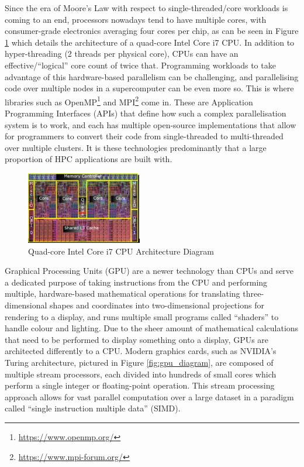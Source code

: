 \documentclass[conference]{IEEEtran}
\begin{document}
Since the era of Moore’s Law with respect to single-threaded/core workloads is coming to an end\cite{mooreslaw}, processors nowadays tend to have multiple cores, with consumer-grade electronics averaging four cores per chip, as can be seen in Figure \ref{fig:cpu_diagram} which details the architecture of a quad-core Intel Core i7 CPU. In addition to hyper-threading (2 threads per physical core), CPUs can have an effective/``logical” core count of twice that. Programming workloads to take advantage of this hardware-based parallelism can be challenging, and parallelising code over multiple nodes in a supercomputer can be even more so. This is where libraries such as OpenMP\footnote{\url{https://www.openmp.org/}} and MPI\footnote{\url{https://www.mpi-forum.org/}} come in. These are Application Programming Interfaces (APIs) that define how such a complex parallelisation system is to work, and each has multiple open-source implementations that allow for programmers to convert their code from single-threaded to multi-threaded over multiple clusters. It is these technologies predominantly that a large proportion of HPC applications are built with.

\begin{figure}
\centering
\includegraphics[width=0.45\textwidth]{cpu_diagram.png}
\caption{Quad-core Intel Core i7 CPU Architecture Diagram}
\label{fig:cpu_diagram}
\end{figure}

Graphical Processing Units (GPU) are a newer technology than CPUs and serve a dedicated purpose of taking instructions from the CPU and performing multiple, hardware-based mathematical operations for translating three-dimensional shapes and coordinates into two-dimensional projections for rendering to a display, and runs multiple small programs called ``shaders” to handle colour and lighting. Due to the sheer amount of mathematical calculations that need to be performed to display something onto a display, GPUs are architected differently to a CPU. Modern graphics cards, such as NVIDIA’s Turing architecture, pictured in Figure \ref{fig:gpu_diagram}, are composed of multiple stream processors, each divided into hundreds of small cores which perform a single integer or floating-point operation. This stream processing approach allows for vast parallel computation over a large dataset in a paradigm called ``single instruction multiple data” (SIMD).
\end{document}
